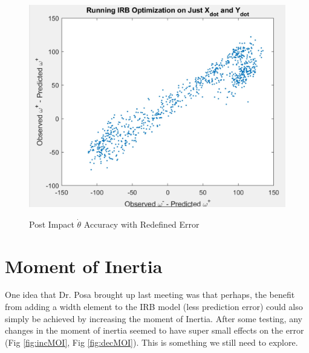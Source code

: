 \documentclass{article}
\begin{document}
\begin{figure}[h!]
\centering
\caption{Post Impact $\dot{\theta}$ Accuracy with Redefined Error}
\includegraphics[scale=0.4]{redErr.jpg}
\label{fig:redErr}
\end{figure}


\section{Moment of Inertia}
One idea that Dr. Posa brought up last meeting was that perhaps, the benefit from adding a width element to the IRB model (less prediction error) could also simply be achieved by increasing the moment of Inertia. After some testing, any changes in the moment of inertia seemed to have super small effects on the error (Fig \ref{fig:incMOI}, Fig \ref{fig:decMOI}). This is something we still need to explore. 
\end{document}

